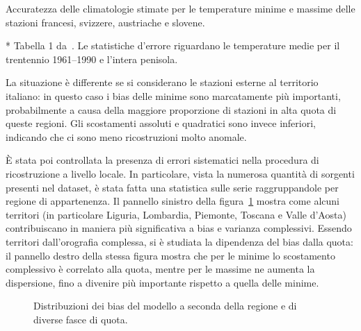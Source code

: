 \begin{table}[ht]
  \centering
  \begin{adjustbox}{max width=\textwidth}
    \begin{threeparttable}
      \caption{Accuratezza delle climatologie stimate per le temperature minime e massime delle stazioni francesi, svizzere, austriache e slovene.}\label{tab:bias-non-ita}
      
      \begin{tablenotes}
      \item[*] Tabella 1 da~\cite[p.~10]{brunettiHighresolutionTemperatureClimatology2014}. Le statistiche d'errore riguardano le temperature medie per il trentennio 1961--1990 e l'intera penisola.
      \end{tablenotes}
    \end{threeparttable}
  \end{adjustbox}
\end{table}
La situazione è differente se si considerano le stazioni esterne al territorio italiano: in questo caso i bias delle minime sono marcatamente più importanti, probabilmente a causa della maggiore proporzione di stazioni in alta quota di queste regioni. Gli scostamenti assoluti e quadratici sono invece inferiori, indicando che ci sono meno ricostruzioni molto anomale.

È stata poi controllata la presenza di errori sistematici nella procedura di ricostruzione a livello locale. In particolare, vista la numerosa quantità di sorgenti presenti nel dataset, è stata fatta una statistica sulle serie raggruppandole per regione di appartenenza. Il pannello sinistro della figura~\ref{fig:boxplots-ita} mostra come alcuni territori (in particolare Liguria, Lombardia, Piemonte, Toscana e Valle d'Aosta) contribuiscano in maniera più significativa a bias e varianza complessivi. Essendo territori dall'orografia complessa, si è studiata la dipendenza del bias dalla quota: il pannello destro della stessa figura mostra che per le minime lo scostamento complessivo è correlato alla quota, mentre per le massime ne aumenta la dispersione, fino a divenire più importante rispetto a quella delle minime.

\begin{figure}[ht]
  \centering
  
  \caption{Distribuzioni dei bias del modello a seconda della regione e di diverse fasce di quota.}\label{fig:boxplots-ita}
\end{figure}

